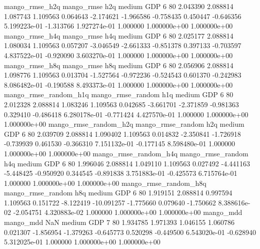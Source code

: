        mango_rmse_h2q        mango_rmse                  h2q     medium      GDP                 6 80  2.043390       2.088814 1.087743       1.109563    0.064643     -2.174621     -1.966586    -0.758435       0.450447 -0.646356 5.199223e-01    -1.313766   1.927274e-01            1.000000    1.000000e+00        1.000000e+00
       mango_rmse_h4q        mango_rmse                  h4q     medium      GDP                 6 80  2.025177       2.088814 1.080034       1.109563    0.057207     -3.046549     -2.661333    -0.851378       0.397133 -0.703597 4.837522e-01    -0.920090   3.603270e-01            1.000000    1.000000e+00        1.000000e+00
       mango_rmse_h8q        mango_rmse                  h8q     medium      GDP                 6 80  2.056906       2.088814 1.098776       1.109563    0.013704     -1.527564     -0.972236    -0.524543       0.601370 -0.242983 8.086482e-01    -0.190588   8.493373e-01            1.000000    1.000000e+00        1.000000e+00
mango_rmse_random_h1q mango_rmse_random                  h1q     medium      GDP                 6 80  2.012328       2.088814 1.083246       1.109563    0.042685     -3.661701     -2.371859    -0.981363       0.329410 -0.486418 6.280178e-01    -0.771424   4.427570e-01            1.000000    1.000000e+00        1.000000e+00
mango_rmse_random_h2q mango_rmse_random                  h2q     medium      GDP                 6 80  2.039709       2.088814 1.090402       1.109563    0.014832     -2.350841     -1.726918    -0.739939       0.461530 -0.366310 7.151132e-01    -0.177145   8.598480e-01            1.000000    1.000000e+00        1.000000e+00
mango_rmse_random_h4q mango_rmse_random                  h4q     medium      GDP                 6 80  1.996046       2.088814 1.049110       1.109563    0.027492     -4.441163     -5.448425    -0.950920       0.344545 -0.891838 3.751883e-01    -0.425573   6.715764e-01            1.000000    1.000000e+00        1.000000e+00
mango_rmse_random_h8q mango_rmse_random                  h8q     medium      GDP                 6 80  1.919151       2.088814 0.997594       1.109563    0.151722     -8.122419    -10.091257    -1.775660       0.079640 -1.750662 8.388616e-02    -2.054751   4.320883e-02            1.000000    1.000000e+00        1.000000e+00
            mango_mdd         mango_mdd                  NaN     medium      GDP                 7 80  1.934785       1.971393 1.046155       1.060786    0.021307     -1.856954     -1.379263    -0.645773       0.520298 -0.449500 6.543020e-01    -0.628940   5.312025e-01            1.000000    1.000000e+00        1.000000e+00
